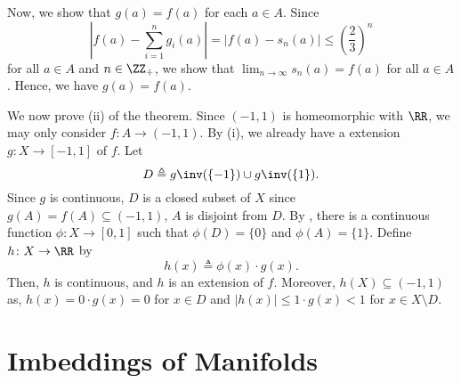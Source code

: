 \documentclass[MAS331_Note.tex]{subfiles}
\begin{document}
{    Now, we show that $g(a) = f(a)$ for each $a \in A$. Since
    \[
        \left|f(a) - \sum_{i=1}^{n} g_i(a)\right| = |f(a) - s_n(a)| \le
        \left(\frac{2}{3}\right)^n
    \]
    for all $a \in A$ and $n \in \ZZ_+$, we show that $\lim_{n \to \infty} s_n(a)
    = f(a)$ for all $a \in A$. Hence, we have $g(a) = f(a)$. \checkmark

    We now prove (ii) of the theorem.
    Since $(-1, 1)$ is homeomorphic with $\RR$, we may only consider
    $f \colon A \to (-1, 1)$. By (i), we already have a extension $g \colon
    X \to [-1, 1]$ of $f$. Let
    \[
        D \triangleq g\inv(\{-1\}) \cup g\inv(\{1\})\text{.}
    \]
    Since $g$ is continuous, $D$ is a closed subset of $X$ since $g(A) = f(A)
    \subseteq (-1, 1)$, $A$ is disjoint from $D$. By ,
    there is a continuous function $\phi \colon X \to [0, 1]$ such that
    $\phi(D) = \{0\}$ and $\phi(A) = \{1\}$. Define $h \colon X \to \RR$ by
    \[
        h(x) \triangleq \phi(x) \cdot g(x)\text{.}
    \]
    Then, $h$ is continuous, and $h$ is an extension of $f$.
    Moreover, $h(X) \subseteq (-1, 1)$ as,
    $h(x) = 0 \cdot g(x) = 0$ for $x \in D$ and $|h(x)| \le 1 \cdot g(x) < 1$
    for $x \in X \setminus D$.
}

\section{Imbeddings of Manifolds}



\end{document}

